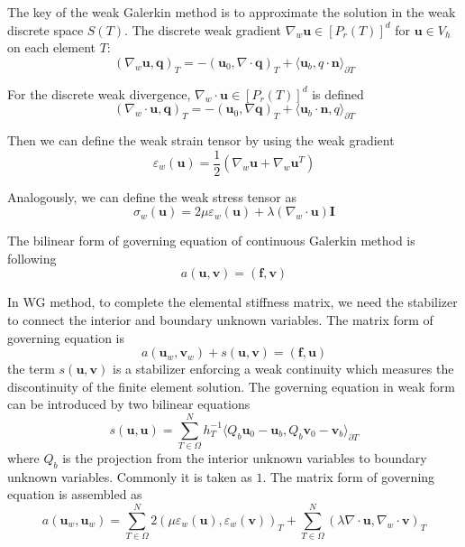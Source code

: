 The key of the weak Galerkin method is to approximate the solution in the weak discrete space $ S(T) $. The discrete weak gradient $ \nabla_{w} \mathbf{u} \in [P_{r} (T)]^{d} $ for $ \mathbf{u} \in V_{h} $ on each element $ T $:
\begin{equation}
(\nabla_w \mathbf{u}, \mathbf{q})_{T} = - (\mathbf{u}_0, \nabla \cdot \mathbf{q})_{T} + \langle \mathbf{u}_b, q \cdot \mathbf{n} \rangle_{\partial T}
\end{equation}

For the discrete weak divergence, $ \nabla_{w} \cdot \mathbf{u} \in [P_{r} (T)]^{d} $ is defined
\begin{equation}
(\nabla_w \cdot \mathbf{u}, \mathbf{q})_{T} = - (\mathbf{u}_0, \nabla  \mathbf{q})_{T} + \langle \mathbf{u}_b \cdot \mathbf{n}, q  \rangle_{\partial T}
\end{equation}

Then we can define the weak strain tensor by using the weak gradient
\begin{equation}
\varepsilon_{w} (\mathbf{u})  = \frac{1}{2} (\nabla_w  \mathbf{u} + \nabla_w  \mathbf{u}^T)
\end{equation}

Analogously, we can define the weak stress tensor as
\begin{equation}
\sigma_{w} ( \mathbf{u}) = 2 \mu \varepsilon_{w} ( \mathbf{u}) + \lambda (\nabla_w \cdot  \mathbf{u}) \mathbf{I}
\end{equation}

The bilinear form of governing equation of continuous Galerkin method is following
\begin{equation}
a( \mathbf{u},  \mathbf{v}) = ( \mathbf{f},  \mathbf{v})
\end{equation}

In WG method, to complete the elemental stiffness matrix, we need the stabilizer to connect the interior and boundary unknown variables. The matrix form of governing equation is
\begin{equation}
a( \mathbf{u}_w,  \mathbf{v}_w) + s( \mathbf{u},  \mathbf{v}) = ( \mathbf{f},  \mathbf{u})
\end{equation}
the term $ s( \mathbf{u},  \mathbf{v}) $ is a stabilizer enforcing a weak continuity which measures the discontinuity of the finite element solution. The governing equation in weak form can be introduced by two bilinear equations
\begin{equation}
s( \mathbf{u},  \mathbf{u}) = \sum_{T\in \Omega}^{N} h_{T}^{-1} \langle Q_{b}  \mathbf{u}_0 -  \mathbf{u}_b, Q_b  \mathbf{v}_0 -  \mathbf{v}_b \rangle_{\partial T}
\end{equation}
where $ Q_b $ is the projection from the interior unknown variables to boundary unknown variables. Commonly it is taken as $ 1 $. The matrix form of governing equation is assembled as
\begin{equation}
a( \mathbf{u}_w,  \mathbf{u}_w) = \sum_{T \in \Omega}^{N} 2(\mu \varepsilon_w ( \mathbf{u}), \varepsilon_w ( \mathbf{v}))_T + \sum_{T \in \Omega}^{N}(\lambda \nabla \cdot \mathbf{u}, \nabla_w \cdot \mathbf{v})_T
\end{equation}


